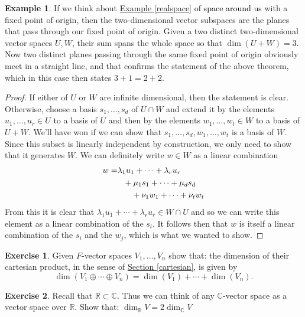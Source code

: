 \documentclass[11pt]{amsbook}
\theoremstyle{definition}
\newtheorem{ex}[theorem]{Example}
\newtheorem{exercise}{Exercise}
\begin{document}
\begin{ex}
If we think about \hyperref[realspace]{Example \ref{realspace}} of {\textcolor{black}{space around us}} with a fixed point of origin, then the two-dimensional vector subspaces are the planes that pass through our fixed point of origin. Given a two distinct two-dimensional vector spaces  $U,W$, their sum spans the whole space so that $\dim (U+W) = 3$. Now two distinct planes passing through the same fixed point of origin obviously meet in a straight line, and that confirms the statement of the above theorem, which in this case then states $3+1 = 2+2$.
\end{ex}
\begin{proof}
If either of $U$ or $W$ are infinite dimensional, then the statement is clear. Otherwise, choose a basis $s_1, \ldots , s_d$ of $U\cap W$ and extend it by the elements $u_1, \ldots, u_r\in U$ to a basis of $U$ and then by the elements $w_1, \ldots , w_t \in W$ to a basis of $U+W$. We'll have won if we can show that $s_1, \ldots , s_d, w_1, \ldots , w_t$ is a basis of $W$. Since this subset is linearly independent by construction, we only need to show that it generates $W$. We can definitely write $w\in W$ as a linear combination
\begin{align*}
w = & \lambda_1 u_1 + \cdots + \lambda_r u_r \\ & \hspace{0.25cm}+ \mu_1s_1 + \cdots + \mu_d s_d \\ & \hspace{0.6cm} + \nu_1 w_1 + \cdots + \nu_t w_t
\end{align*}
From this it is clear that $\lambda_1 u_1 + \cdots + \lambda_r u_r \in W\cap U$ and so we can write this element as a linear combination of the $s_i$. It follows then that $w$ is itself a linear combination of the $s_i$ and the $w_j$, which is what we wanted to show.
\end{proof}

\begin{exercise} \label{dimofdirsum} Given $F$-vector spaces $V_1, \ldots , V_n$ show that: the dimension of their cartesian product, in the sense of \hyperref[cartesian]{Section \ref{cartesian}}, is given by $$\dim (V_1\oplus \cdots \oplus V_n) = \dim(V_1) + \cdots + \dim(V_n).$$\end{exercise}

\begin{exercise} \label{complextoreal} Recall that $\mathbb{R}\subset \mathbb{C}$. Thus we can think of any $\mathbb{C}$-vector space as a vector space over $\mathbb{R}$. Show that: $\dim_{\mathbb{R}}V = 2 \dim_{\mathbb{C}} V$\end{exercise}
\end{document}
